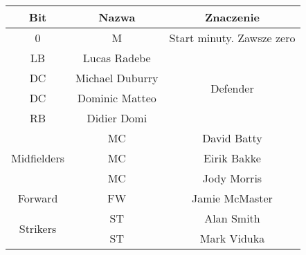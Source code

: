 \begin{center}
\begin{tabular}{|c|c|c|}
	\hline
	Bit	&	Nazwa	& Znaczenie	\\
	\hline
	0	&	M		& Start minuty. Zawsze zero	\\
	\hline
	
 LB & Lucas Radebe		&\multirow{4}{*}{Defender}\\
 DC & Michael Duburry	&\\
 DC & Dominic Matteo	&\\
 RB & Didier Domi		&\\
	\hline
	\multirow{3}{*}{Midfielders}
	& MC & David Batty	\\
	& MC & Eirik Bakke	\\
	& MC & Jody Morris	\\
	\hline
	Forward & FW & Jamie McMaster	\\
	\hline
	\multirow{2}{*}{Strikers}
	& ST & Alan Smith	\\
	& ST & Mark Viduka	\\
	\hline
\end{tabular}
\end{center}
